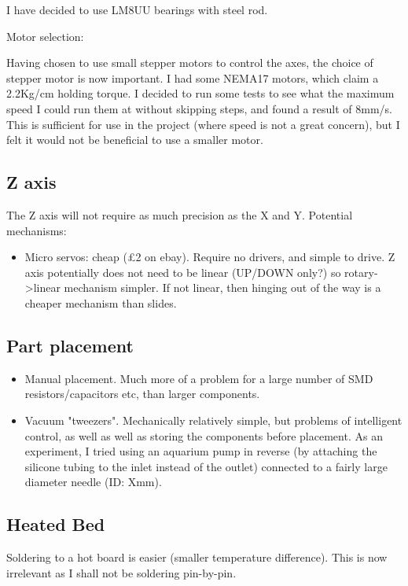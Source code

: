 \documentclass[a4paper,11pt]{article}  %
\begin{document}
I have decided to use LM8UU bearings with steel rod. 

Motor selection:

Having chosen to use small stepper motors to control the axes, the choice of stepper motor is now important. I had
some NEMA17 motors, which claim a 2.2Kg/cm holding torque. I decided to run some tests to see what the maximum
speed I could run them at without skipping steps, and found a result of 8mm/s. This is sufficient for use in the
project (where speed is not a great concern), but I felt it would not be beneficial to use a smaller motor. 

\subsection{Z axis}
The Z axis will not require as much precision as the X and Y. Potential mechanisms:

\begin{itemize}
	\item	Micro servos: cheap (£2 on ebay). Require no drivers, and simple to drive. Z axis potentially
		does not need to be linear (UP/DOWN only?) so rotary-\textgreater linear mechanism simpler. If not linear,
		then hinging out of the way is a cheaper mechanism than slides.
\end{itemize}

\subsection{Part placement}

\begin{itemize}
	\item	Manual placement. Much more of a problem for a large number of SMD resistors/capacitors etc, than
		larger components. 
	\item	Vacuum "tweezers". Mechanically relatively simple, but problems of intelligent control, as well
		as well as storing the components before placement. As an experiment, I tried using an aquarium pump
		in reverse (by attaching the silicone tubing to the inlet instead of the outlet) connected to a fairly
		large diameter needle (ID: Xmm).
\end{itemize}

\subsection{Heated Bed}
Soldering to a hot board is easier (smaller temperature difference). This is now irrelevant as I shall not be soldering pin-by-pin.
\end{document}
